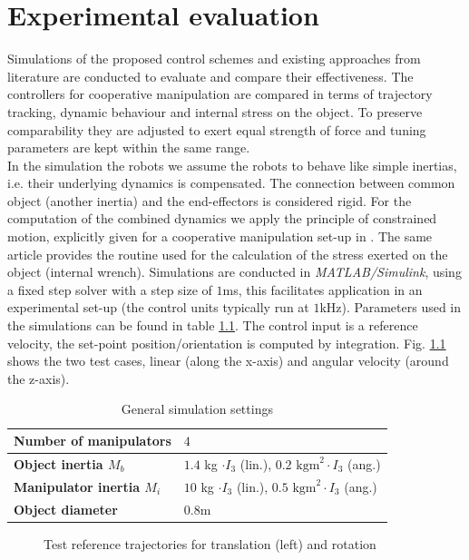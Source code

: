 \documentclass[a4paper,twoside, openright,12pt]{report}
\begin{document}
\chapter{Experimental evaluation}

Simulations of the proposed control schemes and existing approaches from literature are conducted to evaluate and compare their effectiveness. The controllers for cooperative manipulation are compared in terms of trajectory tracking, dynamic behaviour and internal stress on the object. To preserve comparability they are adjusted to exert equal strength of force and tuning parameters are kept within the same range.\\
In the simulation the robots we assume the robots to behave like simple inertias, i.e. their underlying dynamics is compensated. The connection between common object (another inertia) and the end-effectors is considered rigid. For the computation of the combined dynamics we apply the principle of constrained motion, explicitly given for a cooperative manipulation set-up in \cite{Erhart_16}. The same article provides the routine used for the calculation of the stress exerted on the object (internal wrench).
Simulations are conducted in \emph{MATLAB/Simulink}, using a fixed step solver with a step size of $1$ms, this facilitates application in an experimental set-up (the control units typically run at $1$kHz). Parameters used in the simulations can be found in table \ref{TAB:generalsimulationprop}. The control input is a  reference velocity, the set-point position/orientation is computed by integration. Fig. \ref{FIG:ReferenceTrajectory} shows the two test cases, linear (along the x-axis) and angular velocity (around the z-axis). 
\begin{table}[h]
	\centering
	\caption[General simulation settings]{General simulation settings}\vspace{10pt}
	\label{TAB:generalsimulationprop}
	
	\begin{tabular}{ l | l}
		\textbf{Number of manipulators} & \textbf{$4$}\\ \hline
		\textbf{Object inertia $M_b$} & $1.4$ kg $\cdot I_3$ (lin.), $0.2 \text{ kgm}^2 \cdot I_3$ (ang.)\\ \hline
		\textbf{Manipulator inertia $M_i$} & $10$ kg $\cdot I_3$ (lin.), $0.5 \text{ kgm}^2 \cdot I_3$ (ang.) \\ \hline
		\textbf{Object diameter} & $0.8$m \\ \hline
	\end{tabular}
\end{table}
\begin{figure}[h]
\centering

\caption{Test reference trajectories for translation (left) and rotation}
\label{FIG:ReferenceTrajectory}
\end{figure}
\end{document}
